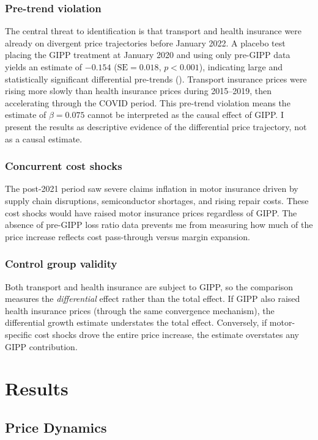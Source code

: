 \documentclass[12pt]{article}
\begin{document}
\subsubsection*{Pre-trend violation} The central threat to identification is that transport and health insurance were already on divergent price trajectories before January 2022. A placebo test placing the GIPP treatment at January 2020 and using only pre-GIPP data yields an estimate of $-0.154$ ($\text{SE} = 0.018$, $p < 0.001$), indicating large and statistically significant differential pre-trends (). Transport insurance prices were rising more slowly than health insurance prices during 2015--2019, then accelerating through the COVID period. This pre-trend violation means the estimate of $\beta = 0.075$ cannot be interpreted as the causal effect of GIPP. I present the results as descriptive evidence of the differential price trajectory, not as a causal estimate.

\subsubsection*{Concurrent cost shocks} The post-2021 period saw severe claims inflation in motor insurance driven by supply chain disruptions, semiconductor shortages, and rising repair costs. These cost shocks would have raised motor insurance prices regardless of GIPP. The absence of pre-GIPP loss ratio data prevents me from measuring how much of the price increase reflects cost pass-through versus margin expansion.

\subsubsection*{Control group validity} Both transport and health insurance are subject to GIPP, so the comparison measures the \textit{differential} effect rather than the total effect. If GIPP also raised health insurance prices (through the same convergence mechanism), the differential growth estimate understates the total effect. Conversely, if motor-specific cost shocks drove the entire price increase, the estimate overstates any GIPP contribution.


\section{Results}

\subsection{Price Dynamics}
\end{document}
